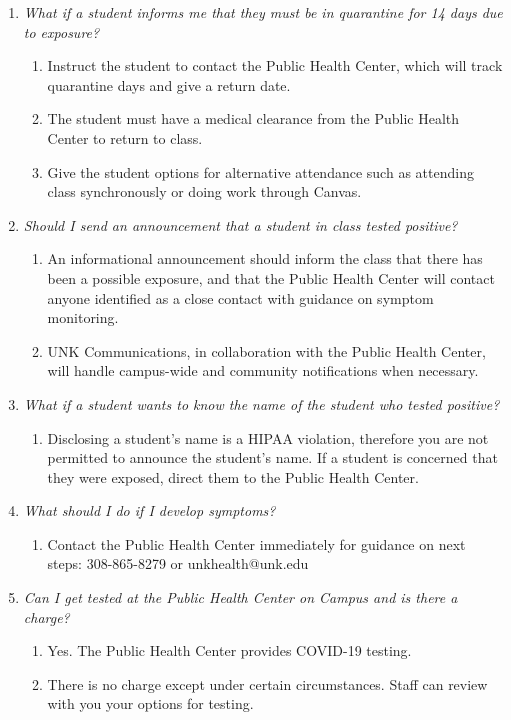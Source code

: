 \documentclass[12pt]{article}
\newcounter{ex}\setcounter{ex}{0}
\begin{document}
\begin{enumerate}
\item \emph{What if a student informs me that they must be in quarantine for 14 days due to exposure?}
\begin{enumerate}
\item	Instruct the student to contact the Public Health Center, which will track quarantine days and give a return date.
\item	The student must have a medical clearance from the Public Health Center to return to class.
\item 	Give the student options for alternative attendance such as attending class synchronously or doing work through Canvas.
\end{enumerate}

\item \emph{Should I send an announcement that a student in class tested positive?}
\begin{enumerate}
\item	An informational announcement should inform the class that there has been a possible exposure, and that the Public Health Center will contact anyone identified as a close contact with guidance on symptom monitoring.
\item	UNK Communications, in collaboration with the Public Health Center, will handle campus-wide and community notifications when necessary.
\end{enumerate}

\item \emph{What if a student wants to know the name of the student who tested positive? }
\begin{enumerate}
\item	Disclosing a student’s name is a HIPAA violation, therefore you are not permitted to announce the student’s name. If a student is concerned that they were exposed, direct them to the Public Health Center.
\end{enumerate}

\item \emph{What should I do if I develop symptoms?}
\begin{enumerate}
\item	Contact the Public Health Center immediately for guidance on next steps: 308-865-8279 or unkhealth@unk.edu
\end{enumerate}

\item \emph{Can I get tested at the Public Health Center on Campus and is there a charge?}
\begin{enumerate}
\item	Yes. The Public Health Center provides COVID-19 testing.
\item	There is no charge except under certain circumstances. Staff can review with you your options for testing.
\end{enumerate}


\end{enumerate}
\end{document}
